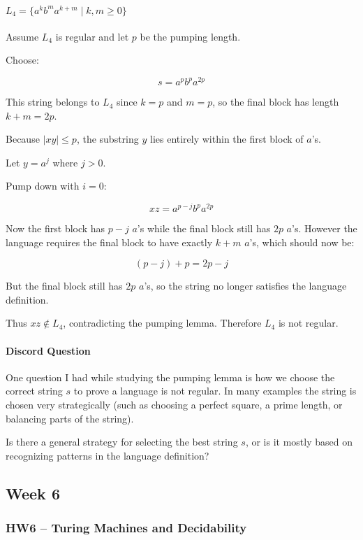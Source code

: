 \documentclass[11pt, a4paper]{article}
\theoremstyle{definition}
\theoremstyle{remark}
\begin{document}
\paragraph{$L_4 = \{a^k b^m a^{k+m} \mid k,m \ge 0\}$}

Assume $L_4$ is regular and let $p$ be the pumping length.

Choose:

\[
s = a^p b^p a^{2p}
\]

This string belongs to $L_4$ since $k=p$ and $m=p$, so the final block has length $k+m = 2p$.

Because $|xy| \le p$, the substring $y$ lies entirely within the first block of $a$'s.

Let $y = a^j$ where $j>0$.

Pump down with $i=0$:

\[
xz = a^{p-j} b^p a^{2p}
\]

Now the first block has $p-j$ $a$'s while the final block still has $2p$ $a$'s. 
However the language requires the final block to have exactly $k+m$ $a$'s, 
which should now be:

\[
(p-j) + p = 2p - j
\]

But the final block still has $2p$ $a$'s, so the string no longer satisfies the language definition.

Thus $xz \notin L_4$, contradicting the pumping lemma. Therefore $L_4$ is not regular.

\paragraph{Discord Question}

One question I had while studying the pumping lemma is how we choose the correct string $s$ to prove a language is not regular. In many examples the string is chosen very strategically (such as choosing a perfect square, a prime length, or balancing parts of the string). 

Is there a general strategy for selecting the best string $s$, or is it mostly based on recognizing patterns in the language definition?

\subsection{Week 6}
\subsubsection*{HW6 -- Turing Machines and Decidability}
\end{document}
